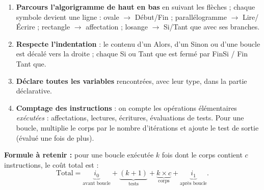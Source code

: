 \documentclass[11pt]{article}
\begin{document}
\begin{methode}
\begin{enumerate}
  \item \textbf{Parcours l'algorigramme de haut en bas} en suivant les flèches ; chaque symbole devient une ligne : ovale $\to$ Début/Fin ; parallélogramme $\to$ Lire/Écrire ; rectangle $\to$ affectation ; losange $\to$ Si/Tant que avec ses branches.
  \item \textbf{Respecte l'indentation} : le contenu d'un Alors, d'un Sinon ou d'une boucle est décalé vers la droite ; chaque Si ou Tant que est fermé par FinSi / Fin Tant que.
  \item \textbf{Déclare toutes les variables} rencontrées, avec leur type, dans la partie déclarative.
  \item \textbf{Comptage des instructions} : on compte les opérations élémentaires \emph{exécutées} : affectations, lectures, écritures, évaluations de tests. Pour une boucle, multiplie le corps par le nombre d'itérations et ajoute le test de sortie (évalué une fois de plus).
\end{enumerate}
\textbf{Formule à retenir :} pour une boucle exécutée $k$ fois dont le corps contient $c$ instructions, le coût total est :
\[ \text{Total} = \underbrace{i_0}_{\text{avant boucle}} + \underbrace{(k+1)}_{\text{tests}} + \underbrace{k \times c}_{\text{corps}} + \underbrace{i_1}_{\text{après boucle}}. \]
\end{methode}
\end{document}

